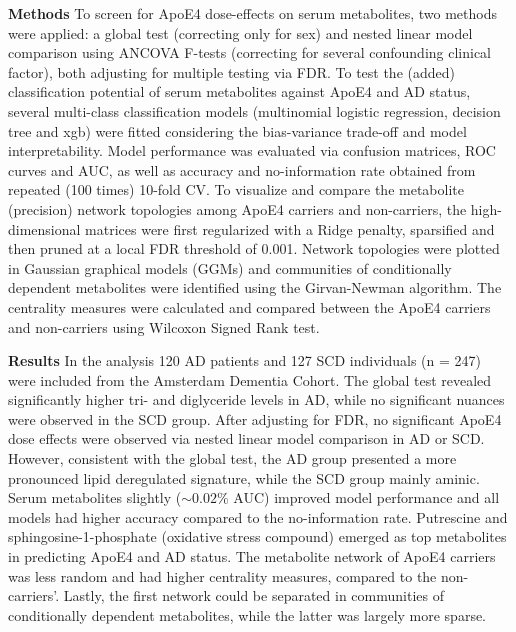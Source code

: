 \documentclass{amsart}
\begin{document}
\textbf{Methods}\hspace{.1cm} To screen for ApoE4 dose-effects on serum metabolites, two methods were applied: a global test (correcting only for sex) and nested linear model comparison using ANCOVA F-tests (correcting for several confounding clinical factor), both adjusting for multiple testing via FDR. To test the (added) classification potential of serum metabolites against ApoE4 and AD status, several multi-class classification models (multinomial logistic regression, decision tree and \acrlong{xgb}) were fitted considering the bias-variance trade-off and model interpretability. Model performance was  evaluated via confusion matrices, ROC curves and AUC, as well as accuracy and no-information rate obtained from repeated (100 times) 10-fold CV. To visualize and compare the metabolite (precision) network topologies among ApoE4 carriers and non-carriers, the high-dimensional matrices were first regularized with a Ridge penalty, sparsified and then pruned at a local FDR threshold of 0.001. Network topologies were plotted in Gaussian graphical models (GGMs) and communities of conditionally dependent metabolites were identified using the Girvan-Newman algorithm. The centrality measures were calculated and compared between the ApoE4 carriers and non-carriers using Wilcoxon Signed Rank test.

\textbf{Results}\hspace{.1cm} 
In the analysis 120 AD patients and 127 SCD individuals (n = 247) were included from the Amsterdam Dementia Cohort. The global test revealed significantly higher tri- and diglyceride levels in AD, while no significant nuances were observed in the SCD group. After adjusting for FDR, no significant ApoE4 dose effects were observed via nested linear model comparison in AD or SCD. However, consistent with the global test, the AD group presented a more pronounced lipid deregulated signature, while the SCD group mainly aminic. Serum metabolites slightly ($\sim0.02\%$ AUC) improved model performance and all models had higher accuracy compared to the no-information rate. Putrescine and sphingosine-1-phosphate (oxidative stress compound) emerged as top metabolites in predicting ApoE4 and AD status. The metabolite network of ApoE4 carriers was less random and had higher centrality measures, compared to the non-carriers'. Lastly, the first network could be separated in communities of conditionally dependent metabolites, while the latter was largely more sparse.
\end{document}
